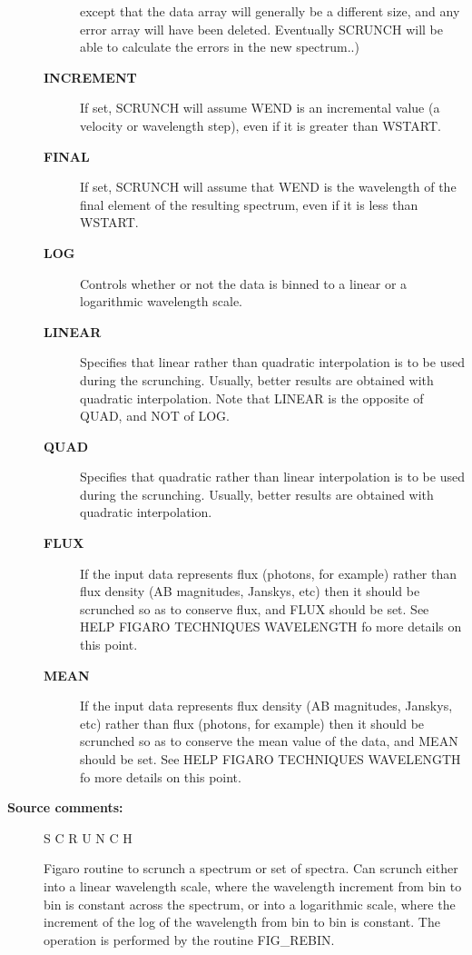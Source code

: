 \begin{description}
\begin{description}
 except that the data array will generally be a different
 size, and any error array will have been deleted.
 Eventually SCRUNCH will be able to calculate the errors
 in the new spectrum..)
\item [\textbf{INCREMENT}]
 If set, SCRUNCH will assume WEND is an incremental value
 (a velocity or wavelength step), even if it is greater
 than WSTART.
\item [\textbf{FINAL}]
 If set, SCRUNCH will assume that WEND is the wavelength
 of the final element of the resulting spectrum, even if
 it is less than WSTART.
\item [\textbf{LOG}]
 Controls whether or not the data is binned to a linear
 or a logarithmic wavelength scale.
\item [\textbf{LINEAR}]
 Specifies that linear rather than quadratic
 interpolation is to be used during the scrunching.  Usually,
 better results are obtained with quadratic interpolation.
 Note that LINEAR is the opposite of QUAD, and NOT of LOG.
\item [\textbf{QUAD}]
 Specifies that quadratic rather than linear
 interpolation is to be used during the scrunching.  Usually,
 better results are obtained with quadratic interpolation.
\item [\textbf{FLUX}]
 If the input data represents flux (photons, for example)
 rather than flux density (AB magnitudes, Janskys, etc)
 then it should be scrunched so as to conserve flux, and
 FLUX should be set.  See HELP FIGARO TECHNIQUES
 WAVELENGTH fo more details on this point.
\item [\textbf{MEAN}]
 If the input data represents flux density (AB magnitudes,
 Janskys, etc) rather than flux (photons, for example)
 then it should be scrunched so as to conserve the mean
 value of the data, and MEAN should be set.  See HELP
 FIGARO TECHNIQUES WAVELENGTH fo more details on this point.
\end{description}

\item [\textbf{Source comments:}]
\begin{terminalv}
 S C R U N C H

 Figaro routine to scrunch a spectrum or set of spectra.  Can scrunch
 either into a linear wavelength scale, where the wavelength
 increment from bin to bin is constant across the spectrum, or
 into a logarithmic scale, where the increment of the log of
 the wavelength from bin to bin is constant.  The operation
 is performed by the routine FIG_REBIN.


\end{terminalv}
\end{description}
